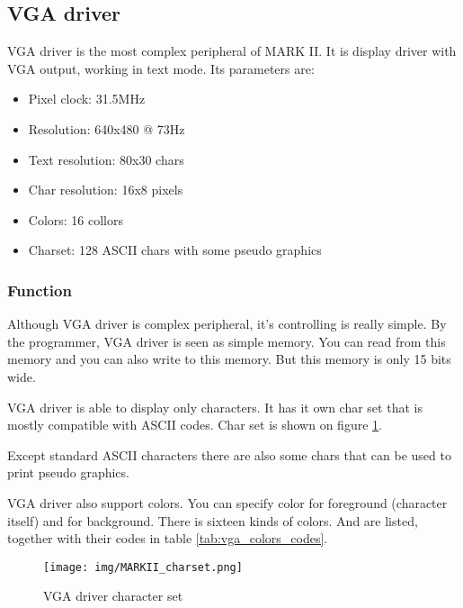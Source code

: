 \subsection{VGA driver}

VGA driver is the most complex peripheral of MARK II. It is display driver with
VGA output, working in text mode. Its parameters are:

\begin{itemize}
    \item Pixel clock: 31.5MHz
    \item Resolution: 640x480 @ 73Hz
    \item Text resolution: 80x30 chars
    \item Char resolution: 16x8 pixels
    \item Colors: 16 collors
    \item Charset: 128 ASCII chars with some pseudo graphics
\end{itemize}

\subsubsection{Function}

Although VGA driver is complex peripheral, it's controlling is really simple.
By the programmer, VGA driver is seen as simple memory. You can read from this
memory and you can also write to this memory. But this memory is only 15 bits
wide.

VGA driver is able to display only characters. It has it own char set that is
mostly compatible with ASCII codes. Char set is shown on figure
\ref{fig:MARK_II_charset}.

Except standard ASCII characters there are also some chars that can be used to
print pseudo graphics.

VGA driver also support colors. You can specify color for foreground (character
itself) and for background. There is sixteen kinds of colors. And are listed,
together with their codes in table \ref{tab:vga_colors_codes}.

\begin{figure}[h]
    \centering
    \texttt{[image: img/MARKII\_charset.png]}
    \caption{VGA driver character set}
    \label{fig:MARK_II_charset}
\end{figure}

